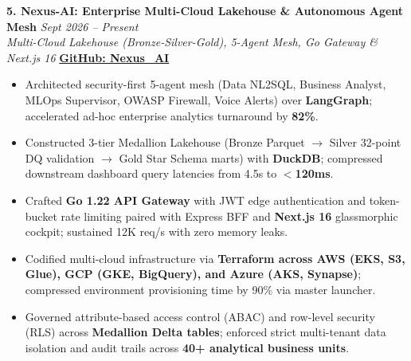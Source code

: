 \documentclass[9.5pt,a4paper]{article}
\begin{document}
\vspace{2.0pt}
\noindent\textbf{5. Nexus-AI: Enterprise Multi-Cloud Lakehouse \& Autonomous Agent Mesh} \hfill {\small\textit{Sept 2026 -- Present}}\\
\textit{Multi-Cloud Lakehouse (Bronze-Silver-Gold), 5-Agent Mesh, Go Gateway \& Next.js 16} \hfill {\footnotesize\href{https://github.com/KishorKumarParoi/Nexus_AI}{\textbf{GitHub: Nexus\_AI}}}
\begin{itemize}
    \item Architected security-first 5-agent mesh (Data NL2SQL, Business Analyst, MLOps Supervisor, OWASP Firewall, Voice Alerts) over \textbf{LangGraph}; accelerated ad-hoc enterprise analytics turnaround by \textbf{82\%}.
    \item Constructed 3-tier Medallion Lakehouse (Bronze Parquet $\to$ Silver 32-point DQ validation $\to$ Gold Star Schema marts) with \textbf{DuckDB}; compressed downstream dashboard query latencies from 4.5s to \textbf{$<$120ms}.
    \item Crafted \textbf{Go 1.22 API Gateway} with JWT edge authentication and token-bucket rate limiting paired with Express BFF and \textbf{Next.js 16} glassmorphic cockpit; sustained 12K req/s with zero memory leaks.
    \item Codified multi-cloud infrastructure via \textbf{Terraform across AWS (EKS, S3, Glue), GCP (GKE, BigQuery), and Azure (AKS, Synapse)}; compressed environment provisioning time by 90\% via master launcher.
    \item Governed attribute-based access control (ABAC) and row-level security (RLS) across \textbf{Medallion Delta tables}; enforced strict multi-tenant data isolation and audit trails across \textbf{40+ analytical business units}.
\end{itemize}
\end{document}
